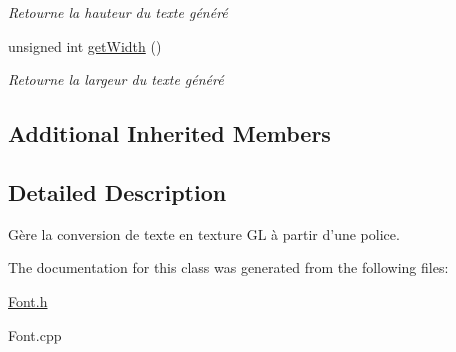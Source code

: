 \begin{DoxyCompactItemize}
\begin{DoxyCompactList}\small\item\em Retourne la hauteur du texte généré \end{DoxyCompactList}\item 
\hypertarget{classFont_aea596fdec8f7f754d90bac37013686bf}{unsigned int \hyperlink{classFont_aea596fdec8f7f754d90bac37013686bf}{get\-Width} ()}\label{classFont_aea596fdec8f7f754d90bac37013686bf}

\begin{DoxyCompactList}\small\item\em Retourne la largeur du texte généré \end{DoxyCompactList}\end{DoxyCompactItemize}
\subsection*{Additional Inherited Members}


\subsection{Detailed Description}
Gère la conversion de texte en texture G\-L à partir d'une police. 

The documentation for this class was generated from the following files\-:\begin{DoxyCompactItemize}
\item 
\hyperlink{Font_8h}{Font.\-h}\item 
Font.\-cpp\end{DoxyCompactItemize}
